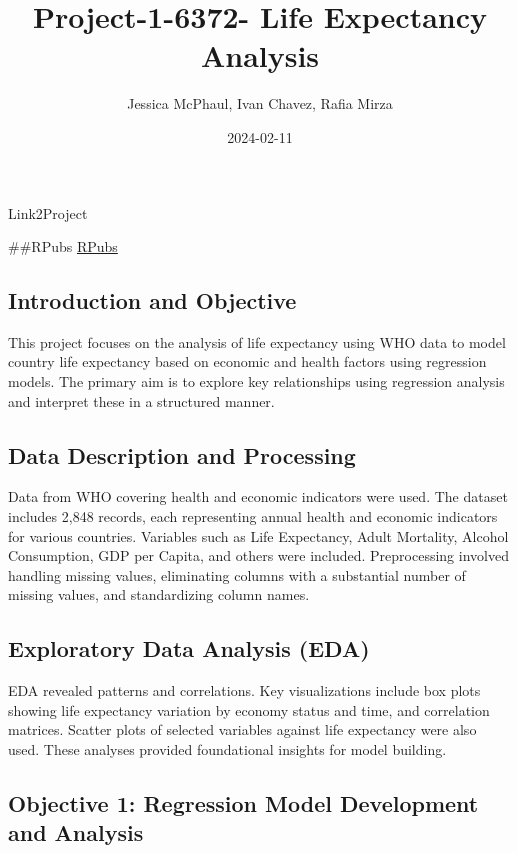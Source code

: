 \documentclass[
]{article}
\title{Project-1-6372- Life Expectancy Analysis}
\author{Jessica McPhaul, Ivan Chavez, Rafia Mirza}
\date{2024-02-11}
\begin{document}
\maketitle

Link2Project

\#\#RPubs \href{https://rpubs.com/Texaschikkita/Project_1_6372}{RPubs}

\hypertarget{introduction-and-objective}{%
\subsection{Introduction and
Objective}\label{introduction-and-objective}}

This project focuses on the analysis of life expectancy using WHO data
to model country life expectancy based on economic and health factors
using regression models. The primary aim is to explore key relationships
using regression analysis and interpret these in a structured manner.

\hypertarget{data-description-and-processing}{%
\subsection{Data Description and
Processing}\label{data-description-and-processing}}

Data from WHO covering health and economic indicators were used. The
dataset includes 2,848 records, each representing annual health and
economic indicators for various countries. Variables such as Life
Expectancy, Adult Mortality, Alcohol Consumption, GDP per Capita, and
others were included. Preprocessing involved handling missing values,
eliminating columns with a substantial number of missing values, and
standardizing column names.

\hypertarget{exploratory-data-analysis-eda}{%
\subsection{Exploratory Data Analysis
(EDA)}\label{exploratory-data-analysis-eda}}

EDA revealed patterns and correlations. Key visualizations include box
plots showing life expectancy variation by economy status and time, and
correlation matrices. Scatter plots of selected variables against life
expectancy were also used. These analyses provided foundational insights
for model building.

\hypertarget{objective-1-regression-model-development-and-analysis}{%
\subsection{Objective 1: Regression Model Development and
Analysis}\label{objective-1-regression-model-development-and-analysis}}
\end{document}
